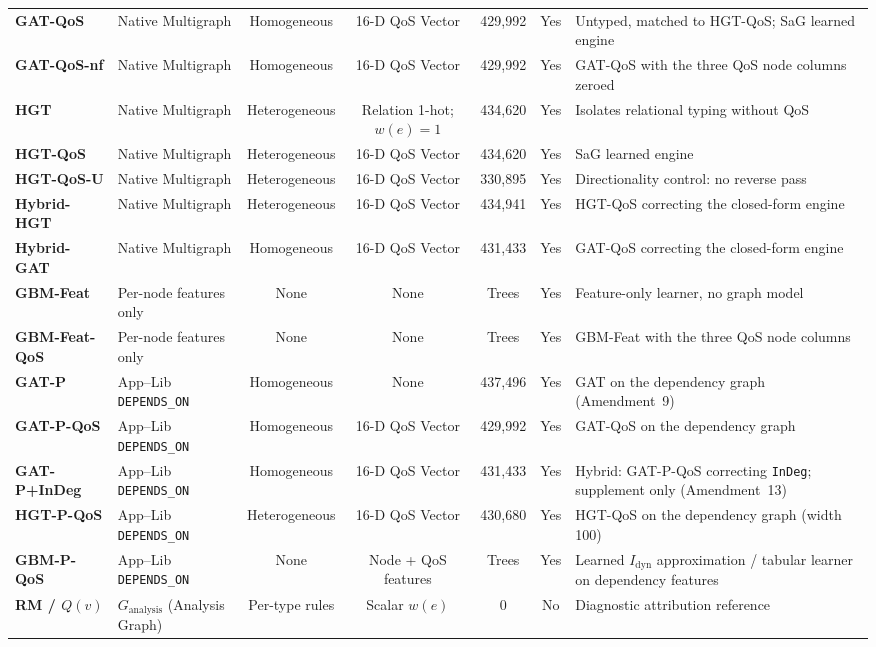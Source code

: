 \documentclass[preprint,3p]{elsarticle}
\begin{document}
\begin{table}[htbp]
{\begin{tabular}{llccccl}
\textbf{GAT-QoS} & Native Multigraph & Homogeneous & 16-D QoS Vector & 429{,}992 & Yes & Untyped, matched to HGT-QoS; SaG learned engine \\
\textbf{GAT-QoS-nf} & Native Multigraph & Homogeneous & 16-D QoS Vector & 429{,}992 & Yes & GAT-QoS with the three QoS node columns zeroed \\
\textbf{HGT} & Native Multigraph & Heterogeneous & Relation 1-hot; $w(e){=}1$ & 434{,}620 & Yes & Isolates relational typing without QoS \\
\textbf{HGT-QoS} & Native Multigraph & Heterogeneous & 16-D QoS Vector & 434{,}620 & Yes & SaG learned engine \\
\textbf{HGT-QoS-U} & Native Multigraph & Heterogeneous & 16-D QoS Vector & 330{,}895 & Yes & Directionality control: no reverse pass \\
\textbf{Hybrid-HGT} & Native Multigraph & Heterogeneous & 16-D QoS Vector & 434{,}941 & Yes & HGT-QoS correcting the closed-form engine \\
\textbf{Hybrid-GAT} & Native Multigraph & Homogeneous & 16-D QoS Vector & 431{,}433 & Yes & GAT-QoS correcting the closed-form engine \\
\textbf{GBM-Feat} & Per-node features only & None & None & Trees & Yes & Feature-only learner, no graph model \\
\textbf{GBM-Feat-QoS} & Per-node features only & None & None & Trees & Yes & GBM-Feat with the three QoS node columns \\
\textbf{GAT-P} & App--Lib \texttt{DEPENDS\_ON} & Homogeneous & None & 437{,}496 & Yes & GAT on the dependency graph (Amendment~9) \\
\textbf{GAT-P-QoS} & App--Lib \texttt{DEPENDS\_ON} & Homogeneous & 16-D QoS Vector & 429{,}992 & Yes & GAT-QoS on the dependency graph \\
\textbf{GAT-P+InDeg} & App--Lib \texttt{DEPENDS\_ON} & Homogeneous & 16-D QoS Vector & 431{,}433 & Yes & Hybrid: GAT-P-QoS correcting \texttt{InDeg}; supplement only (Amendment~13) \\
\textbf{HGT-P-QoS} & App--Lib \texttt{DEPENDS\_ON} & Heterogeneous & 16-D QoS Vector & 430{,}680 & Yes & HGT-QoS on the dependency graph (width 100) \\
\textbf{GBM-P-QoS} & App--Lib \texttt{DEPENDS\_ON} & None & Node + QoS features & Trees & Yes & Learned $I_{\text{dyn}}$ approximation / tabular learner on dependency features \\
\textbf{RM / $Q(v)$} & $G_{\text{analysis}}$ (Analysis Graph) & Per-type rules & Scalar $w(e)$ & 0 & No & Diagnostic attribution reference \\
\bottomrule
\end{tabular}%
}
\end{table}
\end{document}
